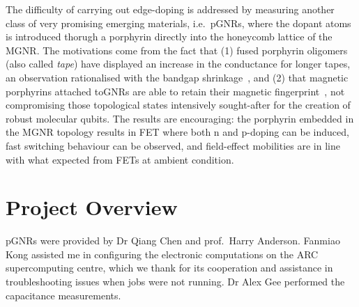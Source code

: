 The difficulty of carrying out edge-doping is addressed by measuring another class of very promising emerging materials, i.e.\ \glspl{pGNR}, where the dopant atoms is introduced thorugh a porphyrin directly into the honeycomb lattice of the \gls{MGNR}. The motivations come from the fact that (1) fused porphyrin oligomers (also called \textit{tape}) have displayed an increase in the conductance for longer tapes, an observation rationalised with the bandgap shrinkage~\cite{leary2018bias}, and (2) that magnetic porphyrins attached to\glspl{GNR} are able to retain their magnetic fingerprint~\cite{he2017fusing}, not compromising those topological states intensively sought-after for the creation of robust molecular qubits. The results are encouraging: the porphyrin embedded in the \gls{MGNR} topology results in \gls{FET} where both n and p-doping can be induced, fast switching behaviour can be observed, and field-effect mobilities are in line with what expected from \glspl{FET} at ambient condition.


\section{Project Overview}
\Glspl{pGNR} were provided by Dr Qiang Chen and prof.\ Harry Anderson. Fanmiao Kong assisted me in configuring the electronic computations on the ARC supercomputing centre, which we thank for its cooperation and assistance in troubleshooting issues when jobs were not running. Dr Alex Gee performed the capacitance measurements.